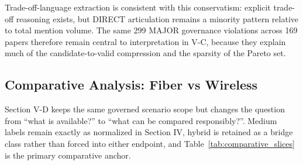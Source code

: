 \documentclass[letterpaper,journal]{IEEEtran}
\begin{document}
Trade-off-language extraction is consistent with this conservatism: explicit trade-off reasoning exists, but DIRECT articulation remains a minority pattern relative to total mention volume. The same 299 MAJOR governance violations across 169 papers therefore remain central to interpretation in V-C, because they explain much of the candidate-to-valid compression and the sparsity of the Pareto set.



\subsection{Comparative Analysis: Fiber vs Wireless}
Section V-D keeps the same governed scenario scope but changes the question from ``what is available?'' to ``what can be compared responsibly?''. Medium labels remain exactly as normalized in Section IV, hybrid is retained as a bridge class rather than forced into either endpoint, and Table~\ref{tab:comparative_slices} is the primary comparative anchor.
\end{document}

